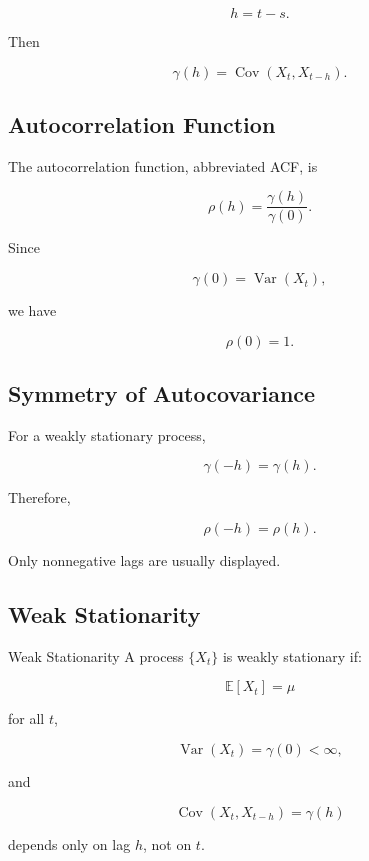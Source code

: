 \[
h=t-s.
\]

Then

\[
\boxed{
\gamma(h)
=
\operatorname{Cov}
(
X_t,
X_{t-h}
).
}
\]

\subsection{Autocorrelation Function}
\label{subsec:autocorrelation-function}

The autocorrelation function, abbreviated ACF, is

\[
\boxed{
\rho(h)
=
\frac{
\gamma(h)
}{
\gamma(0)
}.
}
\]

Since

\[
\gamma(0)
=
\operatorname{Var}(X_t),
\]

we have

\[
\boxed{
\rho(0)=1.
}
\]

\subsection{Symmetry of Autocovariance}
\label{subsec:autocovariance-symmetry}

For a weakly stationary process,

\[
\boxed{
\gamma(-h)
=
\gamma(h).
}
\]

Therefore,

\[
\boxed{
\rho(-h)
=
\rho(h).
}
\]

Only nonnegative lags are usually displayed.

\subsection{Weak Stationarity}
\label{subsec:weak-stationarity}

\begin{definitionbox}{Weak Stationarity}
A process \(\{X_t\}\) is weakly stationary if:

\[
\boxed{
\mathbb{E}[X_t]
=
\mu
}
\]

for all \(t\),

\[
\boxed{
\operatorname{Var}(X_t)
=
\gamma(0)
<
\infty,
}
\]

and

\[
\boxed{
\operatorname{Cov}
(
X_t,
X_{t-h}
)
=
\gamma(h)
}
\]

depends only on lag \(h\), not on \(t\).
\end{definitionbox}

